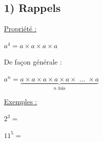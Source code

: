\documentclass[12pt]{article}
\begin{document}
\subsection*{\hspace{1cm} 1) Rappels}

\begin{minipage}[t]{.45\textwidth}%
    \vspace{0pt}
    \begin{mdframed}[
        linewidth=1pt,
        roundcorner=5pt,
        linecolor=Red,
        innertopmargin=10pt,
        innerbottommargin=10pt
    ]
    {\color{red}
    \underline{Propriété :}

    \vspace{5pt}
    $a^4 = a \times a \times a \times a$

    \vspace{5pt}
    De façon générale : 

    \vspace{5pt}
    $a^n = \underbrace{a \times a \times a \times a \times a \times \text{\ ...\ } \times a}_{n \text{\ fois}}$
    }
    \end{mdframed}
\end{minipage}%
\hfill
\begin{minipage}[t]{.45\textwidth}%
    \vspace{0pt}
    \underline{Exemples :}

    \vspace{10pt}
    $2^3 =$

    \vspace{20pt}
    $11^5 = $

    \vspace{2cm}
\end{minipage}%
\end{document}
